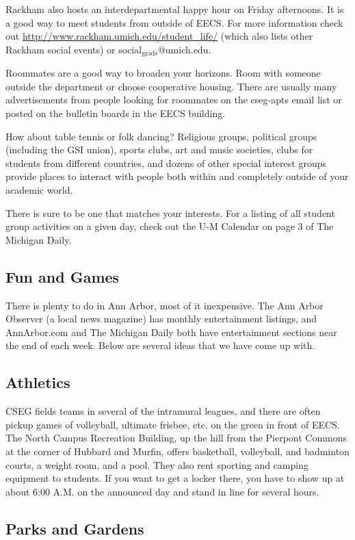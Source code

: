 \documentclass[11pt]{article}
\begin{document}
Rackham also hosts an interdepartmental happy hour on Friday
afternoons. It is a good way to meet students from outside of EECS.
For more information check out
\href{http://www.rackham.umich.edu/student_life/}{http://www.rackham.umich.edu/student\_life/} (which also lists other
Rackham social events) or social$_{\mathrm{grads}}$@umich.edu.

Roommates are a good way to broaden your horizons.  Room with someone
outside the department or choose cooperative housing.  There are
usually many advertisements from people looking for roommates on the
cseg-apts email list or posted on the bulletin boards in the EECS
building.

How about table tennis or folk dancing?  Religious groups, political
  groups (including the GSI union), sports clubs, art and music societies, clubs for students from different countries, and dozens
  of other special interest groups provide places to interact with
  people both within and completely outside of your academic world.

  There is sure to be one that matches your interests.  For a listing
  of all student group activities on a given day, check out the U-M
  Calendar on page 3 of The Michigan Daily.
\subsection{Fun and Games}
\label{sec-12_2}

There is plenty to do in Ann Arbor, most of it inexpensive.  The Ann
Arbor Observer (a local news magazine) has monthly entertainment
listings, and AnnArbor.com and The Michigan Daily both have
entertainment sections near the end of each week. Below are several
ideas that we have come up with.
\subsection{Athletics}
\label{sec-12_3}

CSEG fields teams in several of the intramural leagues, and there are
often pickup games of volleyball, ultimate frisbee, etc. on the green
in front of EECS. The North Campus Recreation Building, up the hill
from the Pierpont Commons at the corner of Hubbard and Murfin, offers
basketball, volleyball, and badminton courts, a weight room, and a
pool. They also rent sporting and camping equipment to students. If
you want to get a locker there, you have to show up at about 6:00
A.M. on the announced day and stand in line for several hours.
\subsection{Parks and Gardens}
\label{sec-12_4}
\end{document}

